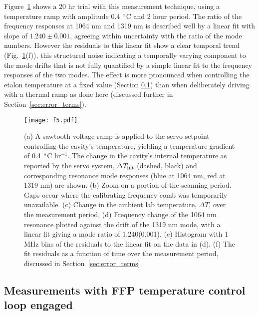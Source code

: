 \documentclass[10pt]{article}
\newcommand{\dC}{$^{\rm o}$C}
\begin{document}
Figure~\ref{fig:driving_ramp} shows a 20 hr trial with this measurement technique, using a temperature ramp with amplitude 0.4 {\dC} and 2 hour period. The ratio of the frequency responses at 1064 nm and 1319 nm is described well by a linear fit with slope of $1.240 \pm 0.001$, agreeing within uncertainty with the ratio of the mode numbers. However the residuals to this linear fit show a clear temporal trend (Fig.~\ref{fig:driving_ramp}(f)), this structured noise indicating a temporally varying component to the mode drifts that is not fully quantified by a simple linear fit to the frequency responses of the two modes. The effect is more pronounced when controlling the etalon temperature at a fixed value (Section \ref{sec:stable_temp}) than when deliberately driving with a thermal ramp as done here (discussed further in Section~\ref{sec:error_terms}). 

\begin{figure}
\texttt{[image: f5.pdf]}
\caption{(a) A sawtooth voltage ramp is applied to the servo setpoint controlling the cavity's temperature, yielding a temperature gradient of 0.4 {\dC} hr$^{-1}$. The change in the cavity's internal temperature as reported by the servo system, $\Delta T_{\rm int}$ (dashed, black) and corresponding resonance mode responses (blue at 1064 nm, red at 1319 nm) are shown. (b) Zoom on a portion of the scanning period. Gaps occur where the calibrating frequency comb was temporarily unavailable. (c) Change in the ambient lab temperature, $\Delta T$, over the measurement period. (d) Frequency change of the 1064 nm resonance plotted against the drift of the 1319 nm mode, with a linear fit giving a mode ratio of 1.240(0.001). (e) Histogram with 1 MHz bins of the residuals to the linear fit on the data in (d). (f) The fit residuals as a function of time over the measurement period, discussed in Section~\ref{sec:error_terms}.}
\label{fig:driving_ramp}
\end{figure}

\subsection{Measurements with FFP temperature control loop engaged}
\label{sec:stable_temp}
\end{document}
